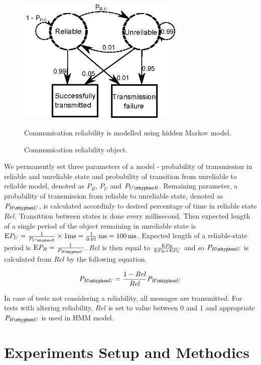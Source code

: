 \begin{figure}
\begin{center}
\includegraphics[width=8cm]{img/hmm_reliability.eps}
\end{center}
\caption{\footnotesize Communication reliability object.}{\footnotesize Communication 
reliability is modelled using hidden Markov model.}
\label{fig_hmm_reliability}
\end{figure}

We permanently set three parameters of a model - probability of transmission in reliable and
unreliable state and probability of transition from unreliable to reliable model, denoted as
$P_{R}$, $P_{U}$ and $P_{U\mhyphen R}$. Remaining
parameter, a probability of transmission from reliable to unreliable state, denoted as
$P_{R \mhyphen U}$, is calculated accordinly to desired percentage of time in reliable state
$Rel$.
Transittion between states is done every millisecond. Then expected length of a single period
of the object remaining in unreliable state is $\mathrm{E}P_U = {1 \over P_{U\mhyphen R}} \times 1
\mathrm{ms} = {1
\over 0.01}\,\mathrm{ms} = 100\,\mathrm{ms}$. Expected length of a reliable-state period is
$\mathrm{E}P_R = {1 \over
P_{R\mhyphen U}}$. $Rel$ is then equal to $\mathrm{E}P_R \over \mathrm{E}P_R + \mathrm{E}P_U$ and so 
$P_{R\mhyphen U}$ is
calculated from $Rel$ by the following equation.

\begin{equation}
P_{R\mhyphen U} = { 1 - Rel \over Rel } P_{R\mhyphen U}
\end{equation}

In case of tests not considering a reliability, all messages are transmitted. For tests with
altering reliability, $Rel$ is set to value between $0$ and $1$ and appropriate $P_{R\mhyphen
U}$ is used in HMM model.



\section{Experiments Setup and Methodics}
\label{sec_methodics}

